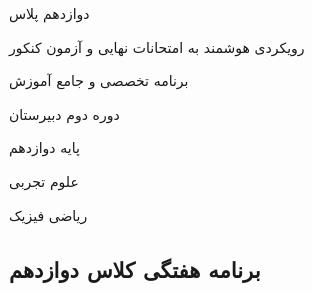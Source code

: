 \documentclass[a4paper]{article}
\begin{document}
\begin{titlepage}
    \centering

    {\Huge دوازدهم پلاس\par}

    \vspace{0.5cm}

    {\Large رویکردی هوشمند به امتحانات نهایی و آزمون کنکور\par}

    \vspace{2cm} %

    {\Large برنامه تخصصی و جامع آموزش\par}

    \vspace{0.5cm}

    {\normalsize دوره دوم دبیرستان\par}

    \vspace{0.25cm}

    {\normalsize پایه دوازدهم\par}

    \vspace{1cm} %

    {\large علوم تجربی\par}

    \vspace{0.25cm}

    {\large ریاضی فیزیک\par}

\end{titlepage}
\newpage

\begin{center}
\section*{برنامه هفتگی کلاس دوازدهم}
\end{center}
\vspace{1em}
\end{document}
